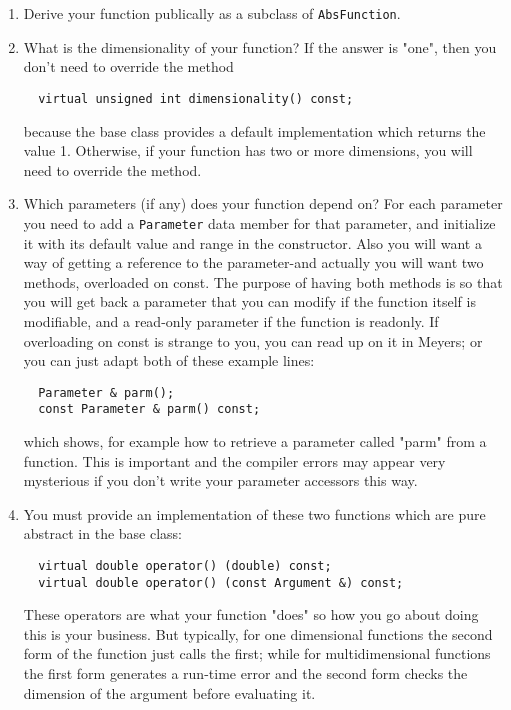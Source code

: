 \documentclass{report}
\begin{document}
\begin{enumerate}
\item{Derive your function publically as a subclass of \verb#AbsFunction#.}

\item {What is the dimensionality of your function?  If the answer is "one", then you
don't need to override the method
\begin{verbatim}
  virtual unsigned int dimensionality() const;
\end{verbatim}
because the base class provides a default implementation which returns
the value 1.  Otherwise, if your function has two or more dimensions,
you will need to override the method.}

\item {Which parameters (if any) does your function depend on?  For
each parameter you need to add a \verb#Parameter# data member for that
parameter, and initialize it with its default value and range in the
constructor.  Also you will want a way of getting a reference to the
parameter-and actually you will want two methods, overloaded on const.
The purpose of having both methods is so that you will get back a
parameter that you can modify if the function itself is modifiable,
and a read-only parameter if the function is readonly.  If overloading
on const is strange to you, you can read up on it in Meyers; or you
can just adapt both of these example lines:
\begin{verbatim}
  Parameter & parm();
  const Parameter & parm() const;
\end{verbatim}
which shows, for example how to retrieve a parameter called "parm"
from a function. This is important and the compiler errors may appear
very mysterious if you don't write your parameter accessors this way.}

\item {You must provide an implementation of these two functions which 
are pure abstract in the base class:
\begin{verbatim}
  virtual double operator() (double) const;   
  virtual double operator() (const Argument &) const;
\end{verbatim}
These operators are what your function "does" so how you go about
doing this is your business.  But typically, for one dimensional
functions the second form of the function just calls the first; while
for multidimensional functions the first form generates a run-time
error and the second form checks the dimension of the argument before
evaluating it.}


\end{enumerate}
\end{document}
